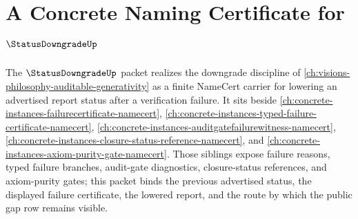 \chapter{A Concrete Naming Certificate for $\StatusDowngradeUp$}
\label{ch:concrete-instances-statusdowngrade-namecert}

The $\StatusDowngradeUp$ packet realizes the downgrade discipline of \autoref{ch:visions-philosophy-auditable-generativity} as a finite NameCert carrier for lowering an advertised report status after a verification failure. It sits beside \autoref{ch:concrete-instances-failurecertificate-namecert}, \autoref{ch:concrete-instances-typed-failure-certificate-namecert}, \autoref{ch:concrete-instances-auditgatefailurewitness-namecert}, \autoref{ch:concrete-instances-closure-status-reference-namecert}, and \autoref{ch:concrete-instances-axiom-purity-gate-namecert}. Those siblings expose failure reasons, typed failure branches, audit-gate diagnostics, closure-status references, and axiom-purity gates; this packet binds the previous advertised status, the displayed failure certificate, the lowered report, and the route by which the public gap row remains visible.

